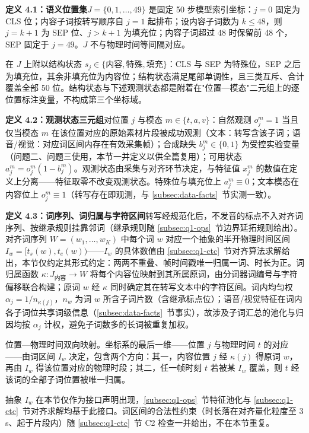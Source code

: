 \documentclass[colorprint,nocoverzero]{gmcmthesis}
\begin{document}
\textbf{定义 4.1：语义位置集}$J=\{0,1,\dots,49\}$ 是固定 50 步模型索引坐标：$j=0$ 固定为 CLS 位；内容子词按转写顺序自 $j=1$ 起排布；设内容子词数为 $k\le 48$，则 $j=k+1$ 为 SEP 位、$j>k+1$ 为填充位；内容子词超过 48 时保留前 48 个，SEP 固定于 $j=49$。$J$ 不与物理时间等间隔对应。

在 $J$ 上附以结构状态 $s_j\in\{\text{内容},\text{特殊},\text{填充}\}$：CLS 与 SEP 为特殊位，SEP 之后为填充位，其余非填充位为内容位；结构状态满足尾部单调性，且三类互斥、合计覆盖全部 50 位。结构状态与下述观测状态都是附着在"位置—模态"二元组上的逐位置标注变量，不构成第三个坐标域。

\textbf{定义 4.2：观测状态三元组}对位置 $j$ 与模态 $m\in\{t,a,v\}$：自然观测 $o_j^m=1$ 当且仅当模态 $m$ 在该位置对应的原始素材片段被成功观测（文本：转写含该子词；语音/视觉：对应词区间内存在有效采集帧）；合成缺失 $b_j^m\in\{0,1\}$ 为受控实验变量（问题二、问题三使用，本节一并定义以供全篇复用）；可用状态 $a_j^m=o_j^m(1-b_j^m)$。观测状态由采集与对齐环节决定，与特征值 $x_j^m$ 的数值在定义上分离——特征取零不改变观测状态。特殊位与填充位上 $a_j^m\equiv 0$；文本模态在内容位上 $o_j^m\equiv 1$（转写存在即观测，与 \ref{subsec:data-facts}~节实测一致）。

\textbf{定义 4.3：词序列、词归属与字符区间}转写经规范化后，不发音的标点不入对齐词序列、按继承规则挂靠邻词（继承规则随 \ref{subsec:q1-ops}~节边界延拓规则给出）。对齐词序列 $W=(w_1,\dots,w_K)$ 中每个词 $w$ 对应一个抽象的半开物理时间区间 $I_w=[t_s(w),t_e(w))$——$I_w$ 的具体数值由 \ref{subsec:q1-ctc}~节对齐算法求解给出，本节仅约定其形式约定：两两不重叠、帧时间戳唯一归属一词、时长为正。词归属函数 $\kappa:J_{\text{内容}}\to W$ 将每个内容位映射到其所属原词，由分词器词编号与字符偏移联合构建；原词 $w$ 经 $\kappa$ 同时确定其在转写文本中的字符区间。词内均匀权 $\alpha_j=1/n_{\kappa(j)}$，$n_w$ 为词 $w$ 所含子词片数（含继承标点位）；语音/视觉特征在词内各子词位共享词级信息（\ref{subsec:data-facts}~节事实），故涉及子词汇总的池化与归因均按 $\alpha_j$ 计权，避免子词数多的长词被重复加权。

位置—物理时间双向映射。坐标系的最后一维——位置 $j$ 与物理时间 $t$ 的对应——由词区间 $I_w$ 决定，包含两个方向：其一，内容位置 $j$ 经 $\kappa(j)$ 得原词 $w$，再由 $I_w$ 得该位置对应的物理时段；其二，任一帧时刻 $t$ 若被某 $I_w$ 覆盖，则 $t$ 经该词的全部子词位置被唯一归属。

抽象 $I_w$ 在本节仅作为接口声明出现，\ref{subsec:q1-ops}~节特征池化与 \ref{subsec:q1-ctc}~节对齐求解均基于此接口。词区间的合法性约束（时长落在对齐量化粒度至 3 s、起于片段内）随 \ref{subsec:q1-ctc}~节 C2 检查一并给出，不在本节重复。
\end{document}
